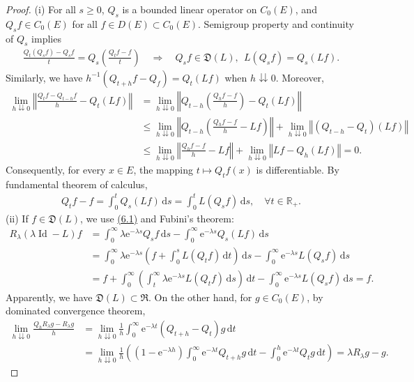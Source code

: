 \documentclass{article}
\numberwithin{equation}{section}
\newcommand{\e}{\mathrm{e}}
\DeclareMathOperator{\id}{Id}
\renewcommand{\d}{\mathrm{d}}
\theoremstyle{plain}
\theoremstyle{definition}
\begin{document}
\begin{proof}
(i) For all $s\geq 0$, $Q_s$ is a bounded linear operator on $C_0(E)$, and $Q_sf\in C_0(E)$ for all $f\in D(E)\subset C_0(E)$. Semigroup property and continuity of $Q_s$ implies
\begin{align*}
	\frac{Q_t(Q_sf)-Q_sf}{t} = Q_s\left(\frac{Q_tf-f}{t}\right)\quad\Rightarrow\quad Q_sf\in \mathfrak{D}(L),\ \ L(Q_s f) = Q_s(L f).
\end{align*}
Similarly, we have $h^{-1}\left(Q_{t+h}f-Q_f\right)=Q_t(Lf)$ when $h\downdownarrows 0$. Moreover,
\begin{align*}
	\lim_{h\downdownarrows 0}\left\Vert\frac{Q_t f - Q_{t-h}f}{h} - Q_t(Lf)\right\Vert&=\lim_{h\downdownarrows 0}\left\Vert Q_{t-h}\left(\frac{Q_h f-f}{h}\right)-Q_t(Lf)\right\Vert\\
	&\leq\lim_{h\downdownarrows 0}\left\Vert Q_{t-h}\left(\frac{Q_h f-f}{h}-Lf\right)\right\Vert+\lim_{h\downdownarrows 0}\left\Vert(Q_{t-h}-Q_t)(Lf)\right\Vert\\
	&\leq\lim_{h\downdownarrows 0}\left\Vert\frac{Q_h f-f}{h}-Lf\right\Vert+\lim_{h\downdownarrows 0}\left\Vert Lf-Q_h(Lf)\right\Vert = 0.
\end{align*}
Consequently, for every $x\in E$, the mapping $t\mapsto Q_tf(x)$ is differentiable. By fundamental theorem of calculus,
\begin{align*}
	Q_tf-f = \int_0^t Q_s(Lf)\,\d s = \int_0^t L(Q_sf)\,\d s,\quad\forall t\in\mathbb{R}_+.
\end{align*}
(ii) If $f\in\mathfrak{D}(L)$, we use \hyperref[eq:6.1]{(6.1)} and Fubini's theorem:
\begin{align*}
R_\lambda(\lambda\id - L)f &= \int_0^\infty \lambda\e^{-\lambda s}Q_sf\,\d s-\int_0^\infty \e^{-\lambda s}Q_s(Lf)\,\d s\\
&=\int_0^\infty \lambda\e^{-\lambda s}\left(f+\int_0^s L(Q_tf)\,\d t\right)\,\d s -\int_0^\infty \e^{-\lambda s}L(Q_sf)\,\d s\\
&= f+\int_0^\infty\left(\int_t^\infty\lambda\e^{-\lambda s}L(Q_t f)\,\d s\right)\,\d t-\int_0^\infty \e^{-\lambda s}L(Q_sf)\,\d s = f.
\end{align*}
Apparently, we have $\mathfrak{D}(L)\subset\mathfrak{R}$. On the other hand, for $g\in C_0(E)$, by dominated convergence theorem,
\begin{align*}
	\lim_{h\downdownarrows 0}\frac{Q_hR_\lambda g-R_\lambda g}{h} &= \lim_{h\downdownarrows 0}\frac{1}{h}\int_0^\infty \e^{-\lambda t}\left(Q_{t+h}-Q_t\right)g\,\d t\\
	&=\lim_{h\downdownarrows 0}\frac{1}{h}\left(\left(1-\e^{-\lambda h}\right)\int_0^\infty \e^{-\lambda t}Q_{t+h} g\,\d t-\int_0^h\e^{-\lambda t}Q_tg\,\d t\right) = \lambda R_\lambda g-g.

\end{align*}
\end{proof}
\end{document}
